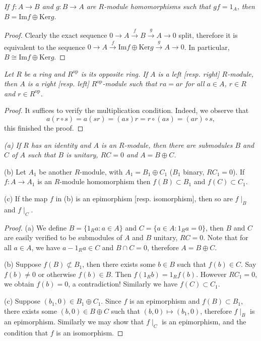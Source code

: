 \begin{problem}\em
If $f:A\to B$ and $g:B\to A$ are $R$-module homomorphisms such that $gf=1_A$, then $B=\mathrm{Im}f\oplus\mathrm{Ker}g$.
\end{problem}
\begin{proof}
Clearly the exact sequence $0\longrightarrow A\overset{f}{\longrightarrow}B\overset{g}{\longrightarrow}A\longrightarrow 0$ split, therefore it is equivalent to the sequence $0\longrightarrow A\overset{f}{\longrightarrow}\mathrm{Im}f\oplus \mathrm{Ker}g\overset{g}{\longrightarrow}A\longrightarrow 0$. In particular, $B\cong\mathrm{Im}f\oplus\mathrm{Ker}g$.
\end{proof}
\begin{problem}\em
Let $R$ be a ring and $R^{\mathrm{op}}$ is its opposite ring. If $A$ is a left [resp. right] $R$-module, then $A$ is a right [resp. left] $R^{\mathrm{op}}$-module such that $ra=ar$ for all $a\in A$, $r\in R$ and $r\in R^{\mathrm{op}}$.
\end{problem}
\begin{proof}
It suffices to verify the multiplication condition. Indeed, we observe that 
$$
a\left( r\circ s \right) =a\left( sr \right) =\left( as \right) r=r\circ \left( as \right) =\left( ar \right) \circ s,
$$
this finished the proof.
\end{proof}
\begin{problem}\em
(a) If $R$ has an identity and $A$ is an $R$-module, then there are submodules $B$ and $C$ of $A$ such that $B$ is unitary, $RC=0$ and $A=B\oplus C$.\par
(b) Let $A_1$ be another $R$-module, with $A_1=B_1\oplus C_1$ ($B_1$ binary, $RC_1=0$). If $f:A\to A_1$ is an $R$-module homomorphism then $f(B)\subset B_1$ and $f(C)\subset C_1$.\par
(c) If the map $f$ in (b) is an epimorphism [resp. isomorphism], then so are $f\mid_B$ and $f\mid_C$.
\end{problem}
\begin{proof}
(a) We define $B=\{1_Ra:a\in A\}$ and $C=\{a\in A:1_Ra=0\}$, then $B$ and $C$ are easily verified to be submodules of $A$ and $B$ unitary, $RC=0$. Note that for all $a\in A$, we have $a-1_Ra\in C$ and $B\cap C=0$, therefore $A=B\oplus C$.\par
(b) Suppose $f(B)\not\subset B_1$, then there exists some $b\in B$ such that $f(b)\in C$. Say $f(b)\ne 0$ or otherwise $f(b)\in B$. Then $f(1_Rb)=1_Rf(b)$. However $RC_1=0$, we obtain $f(b)=0$, a contradiction! Similarly we have $f(C)\subset C_1$.\par
(c) Suppose $(b_1,0)\in B_1\oplus C_1$. Since $f$ is an epimorphism and $f(B)\subset B_1$, there exists some $(b,0)\in B\oplus C$ such that $(b,0)\mapsto (b_1,0)$, therefore $f\mid_B$ is an epimorphism. Similarly we may show that $f\mid_C$ is an epimorphism, and the condition that $f$ is an isomorphism.
\end{proof}
